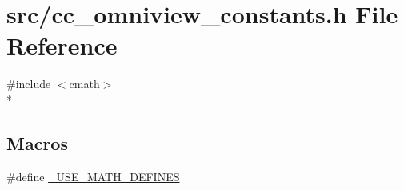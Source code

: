 \hypertarget{a00186}{\section{src/cc\-\_\-omniview\-\_\-constants.h File Reference}
\label{a00186}
}
{\ttfamily \#include $<$cmath$>$}\\*
\subsection*{Macros}
\begin{DoxyCompactItemize}
\item 
\#define \hyperlink{a00186_a525335710b53cb064ca56b936120431e}{\-\_\-\-U\-S\-E\-\_\-\-M\-A\-T\-H\-\_\-\-D\-E\-F\-I\-N\-E\-S}
\end{DoxyCompactItemize}
